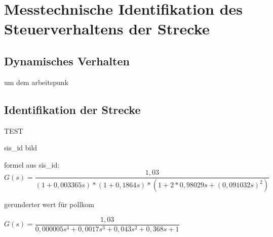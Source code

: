 
\newpage
[Perkowski]
\section{Messtechnische Identifikation des Steuerverhaltens der Strecke}


\subsection{Dynamisches Verhalten}
um dem arbeitspunk

\subsection{Identifikation der Strecke}

TEST

sis\_id bild


formel aus sis\_id: \\

$ G(s) = \dfrac{1,03}{(1 + 0,003365s) * (1 + 0,1864s) * (1 + 2*0,98029s + (0,091032s)^{2}) }$

gerunderter wert für pollkom

$ G(s) =  \dfrac{1,03}{0,000005s^{4} + 0,0017s^{3	} + 0,043s^{2} + 0,368s + 1 } $